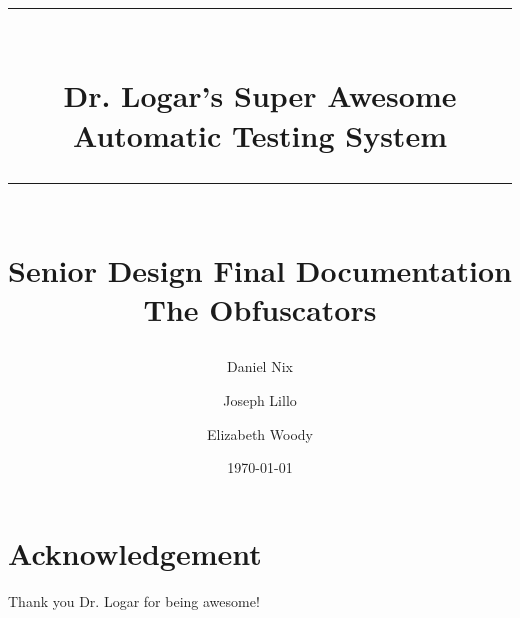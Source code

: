 \documentclass{book}
\title{{\color{MSBlue1} \rule{\linewidth}{0.5mm}}\\[2mm] {\huge \bfseries \color{MSBlue1} Dr. Logar's Super Awesome Automatic Testing System }\\[-1mm] {\color{MSBlue1}\rule{\linewidth}{0.5mm}} \\  \vfill
{\LARGE \bfseries \color{MSBlue2} Senior Design Final Documentation }\\  \vfill 
{\color{MSBlue1} The Obfuscators} }
\author{\color{MSBlue1}  Daniel Nix \and \color{MSBlue1} Joseph Lillo \and  \color{MSBlue1} Elizabeth Woody }
\date{\color{MSBlue1} \today}
\begin{document}
\frontmatter
\maketitle


\tableofcontents
\listoffigures
\listoftables
\listofalgorithms




 
\mainmatter













\backmatter
\chapter{Acknowledgement}
\label{SpecialThanks}  Thank you Dr. Logar for being awesome! 


\setcounter{section}{0}



\setcounter{section}{0}
%


%
%
\end{document}
